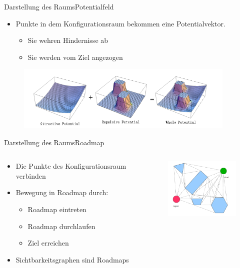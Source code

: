 \documentclass[t,aspectratio=169,dvipsnames]{beamer}
\begin{document}
\begin{frame}{Darstellung des Raums}{Potentialfeld}
			\begin{itemize}
				\item Punkte in dem Konfigurationsraum bekommen eine Potentialvektor.
				\begin{itemize}
					\item Sie wehren Hindernisse ab
					\item Sie werden vom Ziel angezogen
				\end{itemize}
			\end{itemize}
		
			\begin{figure}
				\includegraphics[width=10.5cm]{images/Potential_Field.png}
			\end{figure}
\end{frame}
\begin{frame}{Darstellung des Raums}{Roadmap}
	\begin{columns}
		\begin{column}[T]{0.6\textwidth}
			\begin{itemize}
				\item Die Punkte des Konfigurationsraum verbinden
				\item Bewegung in Roadmap durch:
				\begin{itemize}
					\item Roadmap eintreten
					\item Roadmap durchlaufen
					\item Ziel erreichen
				\end{itemize}
				\item Sichtbarkeitsgraphen sind Roadmaps	
			\end{itemize}
		\end{column}
		\begin{column}[T]{0.4\textwidth}
			\begin{figure}
				\includegraphics[width=4.5cm]{images/Bild3.png}
			\end{figure}
		\end{column}
	\end{columns}
\end{frame}
\end{document}
